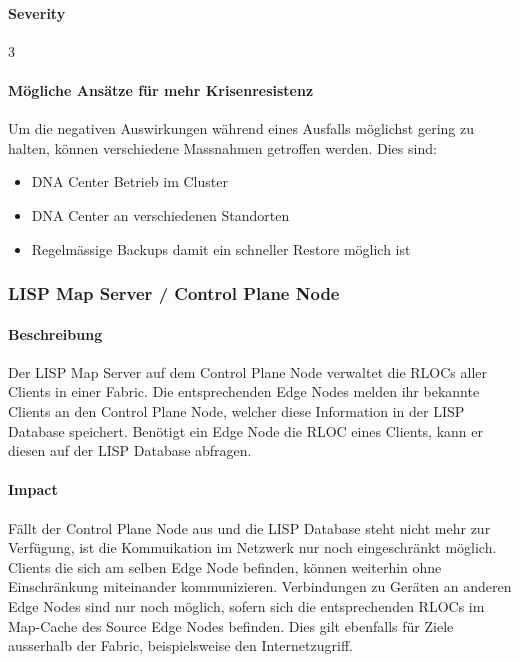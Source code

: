 \paragraph{Severity} 3

\paragraph{Mögliche Ansätze für mehr Krisenresistenz}

Um die negativen Auswirkungen während eines Ausfalls möglichst gering zu halten, können verschiedene Massnahmen getroffen werden. Dies sind:

\begin{itemize}
\item DNA Center Betrieb im Cluster
\item DNA Center an verschiedenen Standorten
\item Regelmässige Backups damit ein schneller Restore möglich ist
\end{itemize}

\subsubsection{LISP Map Server / Control Plane Node}

\paragraph{Beschreibung}

Der LISP Map Server auf dem Control Plane Node verwaltet die RLOCs aller Clients in einer Fabric. Die entsprechenden Edge Nodes melden ihr bekannte Clients an den Control Plane Node, welcher diese Information in der LISP Database speichert. Benötigt ein Edge Node die RLOC eines Clients, kann er diesen auf der LISP Database abfragen.

\paragraph{Impact}

Fällt der Control Plane Node aus und die LISP Database steht nicht mehr zur Verfügung, ist die Kommuikation im Netzwerk nur noch eingeschränkt möglich. Clients die sich am selben Edge Node befinden, können weiterhin ohne Einschränkung miteinander kommunizieren. Verbindungen zu Geräten an anderen Edge Nodes sind nur noch möglich, sofern sich die entsprechenden RLOCs im Map-Cache des Source Edge Nodes befinden. Dies gilt ebenfalls für Ziele ausserhalb der Fabric, beispielsweise den Internetzugriff.

